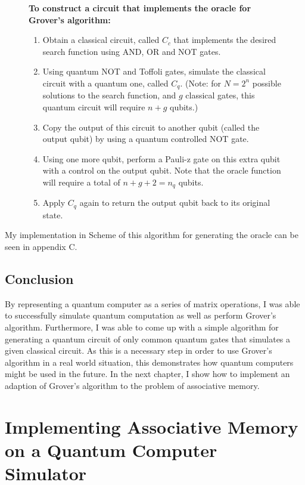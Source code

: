 \documentclass[11pt]{report}
\newcommand{\?}{\stackrel{?}{=}}
\begin{document}
\begin{figure}[H]
\begin{framed}
\textbf{To construct a circuit that implements the oracle for Grover's algorithm:}
\begin{enumerate}
\item Obtain a classical circuit, called $C_{c}$ that implements the desired search function using AND, OR and NOT gates.
\item Using quantum NOT and Toffoli gates, simulate the classical circuit with a quantum one, called $C_{q}$. (Note: for $N=2^n$ possible solutions to the search function, and $g$ classical gates, this quantum circuit will require $n+g$ qubits.)
\item Copy the output of this circuit to another qubit (called the output qubit) by using a quantum controlled NOT gate.
\item Using one more qubit, perform a Pauli-z gate on this extra qubit with a control on the output qubit. Note that the oracle function will require a total of $n+g+2=n_{q}$ qubits.
\item Apply $C_{q}$ again to return the output qubit back to its original state.
\end{enumerate}
\end{framed}
\end{figure}

My implementation in Scheme of this algorithm for generating the oracle can be seen in appendix C.

\section{Conclusion}

By representing a quantum computer as a series of matrix operations, I was able to successfully simulate quantum computation as well as perform Grover's algorithm. Furthermore, I was able to come up with a simple algorithm for generating a quantum circuit of only common quantum gates that simulates a given classical circuit. As this is a necessary step in order to use Grover's algorithm in a real world situation, this demonstrates how quantum computers might be used in the future. In the next chapter, I show how to implement an adaption of Grover's algorithm to the problem of associative memory.


\chapter{Implementing Associative Memory on a Quantum Computer Simulator}
\end{document}
